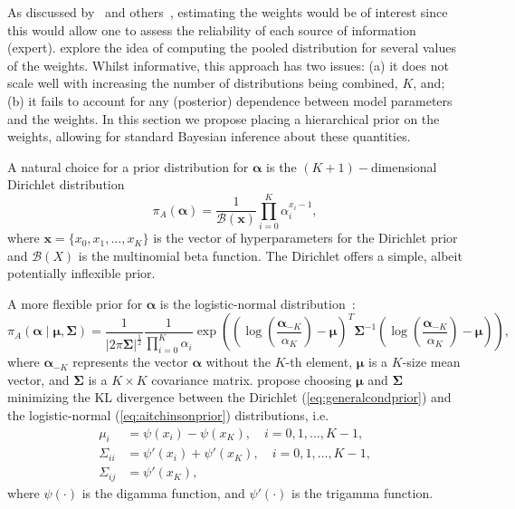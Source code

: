 \documentclass[a4paper, notitlepage, 10pt]{article}
\begin{document}
As discussed by~\cite{Poole2000} and others~\citep{Zhong2015,Li2017}, estimating the weights would be of interest since this would allow one to assess the reliability of each source of information (expert).
\cite{Li2017} explore the idea of computing the pooled distribution for several values of the weights.
Whilst informative, this approach has two issues: (a) it does not scale well with increasing the number of distributions being combined, $K$, and; (b) it fails to account for any (posterior) dependence between model parameters and the weights.
In this section we propose placing a hierarchical prior on the weights, allowing for standard Bayesian inference about these quantities.

A natural choice for a prior distribution for $\boldsymbol\alpha$ is the $(K+1)-$dimensional Dirichlet distribution
\begin{equation}
 \label{eq:generalcondprior}
 \pi_A(\boldsymbol\alpha) = \frac{1}{\mathcal{B}(\boldsymbol x)}\prod_{i=0}^K \alpha_i^{x_i-1},
\end{equation}
where $\boldsymbol x = \{ x_0, x_1, \ldots, x_K\}$ is the vector of hyperparameters for the Dirichlet prior and $\mathcal{B}(X)$ is the multinomial beta function.
The Dirichlet offers a simple, albeit potentially inflexible prior.

A more flexible prior for $\boldsymbol\alpha$ is the logistic-normal distribution~\citep{Aitchson1980}:
\begin{equation}
 \label{eq:aitchinsonprior}
 \pi_A(\boldsymbol\alpha \mid \boldsymbol \mu, \boldsymbol \Sigma) = \frac{1}{|2\pi \boldsymbol \Sigma|^{\frac{1}{2}}}\frac{1}{\prod_{i=0}^K \alpha_i}
  \exp\left(
     \left(\log\left(\frac{\boldsymbol \alpha_{-K}}{\alpha_K}\right) - \boldsymbol \mu\right)^T
     {\boldsymbol \Sigma}^{-1}
     \left(\log\left(\frac{\boldsymbol \alpha_{-K}}{\alpha_K}\right) - \boldsymbol \mu\right)
     \right),
\end{equation}
where $\boldsymbol \alpha_{-K}$ represents the vector $\boldsymbol \alpha$ without the $K$-th element, $\boldsymbol \mu$ is a $K$-size mean vector, and $\boldsymbol \Sigma$ is a $K \times K$ covariance matrix.
\citep{Aitchson1980} propose choosing $\boldsymbol \mu$ and $\boldsymbol \Sigma$ minimizing the KL divergence between the Dirichlet (\ref{eq:generalcondprior}) and the logistic-normal (\ref{eq:aitchinsonprior}) distributions, i.e.
\begin{align}
 \label{eq:momentmatching}
 \mu_i & = \psi(x_i) - \psi(x_K), \quad i=0,1,\ldots,K-1, \\
 \Sigma_{ii} & = \psi'(x_i) + \psi'(x_K), \quad i=0,1,\ldots,K-1, \\
 \Sigma_{ij} & = \psi'(x_K),
\end{align}
where $\psi(\cdot)$ is the digamma function, and $\psi'(\cdot)$ is the trigamma function.
\end{document}
